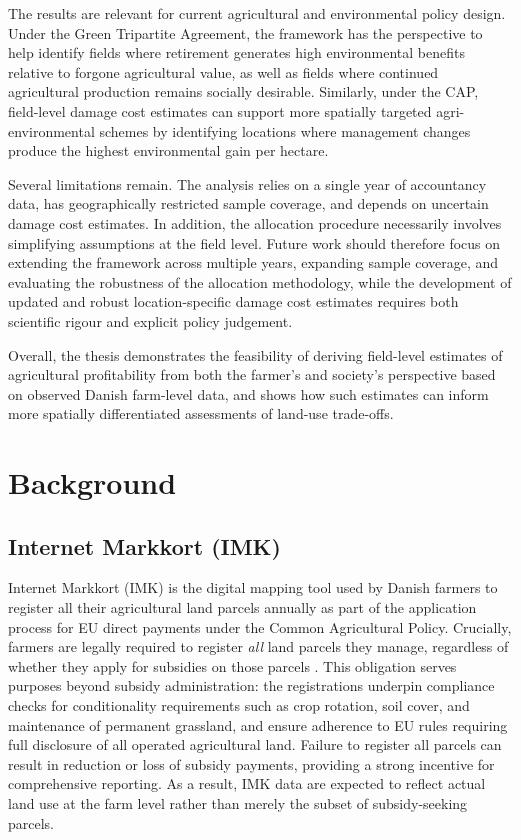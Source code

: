 \documentclass[12pt]{article}
\begin{document}
The results are relevant for current agricultural and environmental policy design. Under the Green Tripartite Agreement, the framework has the perspective to help identify fields where retirement generates high environmental benefits relative to forgone agricultural value, as well as fields where continued agricultural production remains socially desirable. 
Similarly, under the CAP, field-level damage cost estimates can support more spatially targeted agri-environmental schemes by identifying locations where management changes produce the highest environmental gain per hectare.


Several limitations remain. The analysis relies on a single year of accountancy data, has geographically restricted sample coverage, and depends on uncertain damage cost estimates. 
In addition, the allocation procedure necessarily involves simplifying assumptions at the field level. 
Future work should therefore focus on extending the framework across multiple years, expanding sample coverage, and evaluating the robustness of the allocation methodology, while the development of updated and robust location-specific damage cost estimates requires both scientific rigour and explicit policy judgement.

Overall, the thesis demonstrates the feasibility of deriving field-level estimates of agricultural profitability from both the farmer's and society's perspective based on observed Danish farm-level data, and shows how such estimates can inform more spatially differentiated assessments of land-use trade-offs.


\newpage


\appendix

\section{Background}

\subsection{Internet Markkort (IMK)}
\label{sec:imk}
Internet Markkort (IMK) is the digital mapping tool used by Danish farmers to register all their agricultural land parcels annually as part of the application process for EU direct payments under the Common Agricultural Policy. 
Crucially, farmers are legally required to register \textit{all} land parcels they manage, regardless of whether they apply for subsidies on those parcels \citep{landbrugsstyrelsen2023}. 
This obligation serves purposes beyond subsidy administration: the registrations underpin compliance checks for conditionality requirements such as crop rotation, soil cover, and maintenance of permanent grassland, and ensure adherence to EU rules requiring full disclosure of all operated agricultural land. 
Failure to register all parcels can result in reduction or loss of subsidy payments, providing a strong incentive for comprehensive reporting. 
As a result, IMK data are expected to reflect actual land use at the farm level rather than merely the subset of subsidy-seeking parcels.
\end{document}
